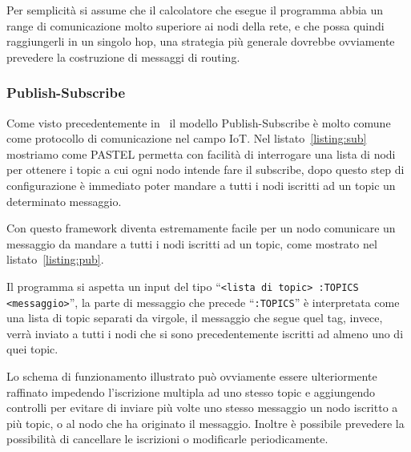 \documentclass[10pt]{article}
\begin{document}
Per semplicità si assume che il calcolatore che esegue il programma abbia un range di comunicazione molto superiore ai nodi della rete, e che possa quindi raggiungerli in un singolo hop, una strategia più generale dovrebbe ovviamente prevedere la costruzione di messaggi di routing.



\subsubsection{Publish-Subscribe}\label{subsubsection:pub-sub}

Come visto precedentemente in~\cite{tandale2017empirical} il modello Publish-Subscribe è molto comune come protocollo di comunicazione nel campo IoT. Nel listato~\ref{listing:sub} mostriamo come PASTEL permetta con facilità di interrogare una lista di nodi per ottenere i topic a cui ogni nodo intende fare il subscribe, dopo questo step di configurazione è immediato poter mandare a tutti i nodi iscritti ad un topic un determinato messaggio.





Con questo framework diventa estremamente facile per un nodo comunicare un messaggio da mandare a tutti i nodi iscritti ad un topic, come mostrato nel listato~\ref{listing:pub}.

Il programma si aspetta un input del tipo ``\texttt{<lista di topic> :TOPICS <messaggio>}'', la parte di messaggio che precede ``\texttt{:TOPICS}'' è interpretata come una lista di topic separati da virgole, il messaggio che segue quel tag, invece, verrà inviato a tutti i nodi che si sono precedentemente iscritti ad almeno uno di quei topic.



Lo schema di funzionamento illustrato può ovviamente essere ulteriormente raffinato impedendo l'iscrizione multipla ad uno stesso topic e aggiungendo controlli per evitare di inviare più volte uno stesso messaggio un nodo iscritto a più topic, o al nodo che ha originato il messaggio. Inoltre è possibile prevedere la possibilità di cancellare le iscrizioni o modificarle periodicamente.
\end{document}
